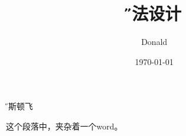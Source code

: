 \documentclass[12pt]{article}
\title{\H 算法设计}
\author{Donald}
\date{\E\today}
\begin{document}
  
\maketitle  
{\H 
 阿斯顿飞
 

这个段落中，夹杂着一个{\E word}。  
}
\end{document}
